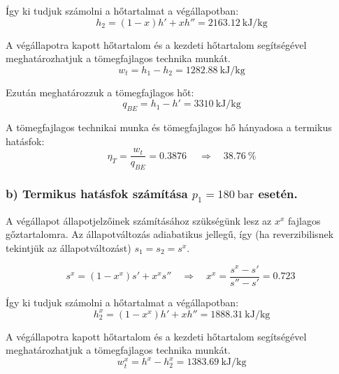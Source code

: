 \noindent Így ki tudjuk számolni a hőtartalmat a végállapotban:
\begin{equation}
	h_2 = \left(1 - x\right) h' + x h'' = \SI{2163,12}{\kilo\joule\per\kilogram}
\end{equation}

\noindent A végállapotra kapott hőtartalom és a kezdeti hőtartalom segítségével meghatározhatjuk a tömegfajlagos technika munkát.
\begin{equation}
	w_t = h_1 - h_2 = \SI{1282,88}{\kilo\joule\per\kilogram}
\end{equation}

\noindent Ezután meghatározzuk a tömegfajlagos hőt:
\begin{equation}
	q_{BE} = h_1 - h' = \SI{3310}{\kilo\joule\per\kilogram}
\end{equation}

\pagebreak

\noindent A tömegfajlagos technikai munka és tömegfajlagos hő hányadosa a termikus hatásfok:
\begin{equation}
	\eta_{T} = \dfrac{w_t}{q_{BE}} = \SI{0,3876}{}
		\quad 
	\Rightarrow
	\quad 
	\SI{38,76}{\percent}
\end{equation}

\subsubsection*{b) Termikus hatásfok számítása $p_1=\SI{180}{\bar}$ esetén.}

A végállapot állapotjelzőinek számításához szükségünk lesz az $x^x$ fajlagos gőztartalomra. Az állapotváltozás adiabatikus jellegű, így (ha reverzibilisnek tekintjük az állapotváltozást) $s_1 = s_2 = s^x $.

\begin{equation}
s^x = \left(1 - x^x\right) s' + x^x s''
\quad 
\Rightarrow
\quad 
x^x =	\dfrac{s^x - s'}{s'' - s'} = \SI{0,723}{}
\end{equation}


\noindent Így ki tudjuk számolni a hőtartalmat a végállapotban:
\begin{equation}
h_2^x = \left(1 - x^x\right) h' + x h'' = \SI{1888,31}{\kilo\joule\per\kilogram}
\end{equation}

\noindent A végállapotra kapott hőtartalom és a kezdeti hőtartalom segítségével meghatározhatjuk a tömegfajlagos technika munkát.
\begin{equation}
w_t^x = h^x- h_2^x = \SI{1383,69}{\kilo\joule\per\kilogram}
\end{equation}

